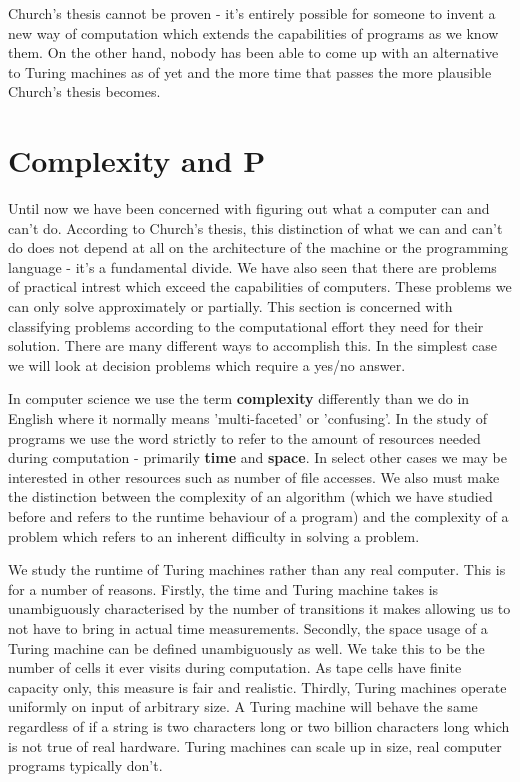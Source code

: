\documentclass[11pt]{article}
\begin{document}
	\par Church's thesis cannot be proven - it's entirely possible for someone to invent a new way of computation which extends the capabilities of programs as we know them. On the other hand, nobody has been able to come up with an alternative to Turing machines as of yet and the more time that passes the more plausible Church's thesis becomes.
	
	\section{Complexity and P}
	Until now we have been concerned with figuring out what a computer can and can't do. According to Church's thesis, this distinction of what we can and can't do does not depend at all on the architecture of the machine or the programming language - it's a fundamental divide. We have also seen that there are problems of practical intrest which exceed the capabilities of computers. These problems we can only solve approximately or partially. This section is concerned with classifying problems according to the computational effort they need for their solution. There are many different ways to accomplish this. In the simplest case we will look at decision problems which require a yes/no answer.
	
	\par 
	In computer science we use the term \textbf{complexity} differently than we do in English where it normally means 'multi-faceted' or 'confusing'. In the study of programs we use the word strictly to refer to the amount of resources needed during computation - primarily \textbf{time} and \textbf{space}. In select other cases we may be interested in other resources such as number of file accesses. We also must make the distinction between the complexity of an algorithm (which we have studied before and refers to the runtime behaviour of a program) and the complexity of a problem which refers to an inherent difficulty in solving a problem. 
	
	\par 
	We study the runtime of Turing machines rather than any real computer. This is for a number of reasons. Firstly, the time and Turing machine takes is unambiguously characterised by the number of transitions it makes allowing us to not have to bring in actual time measurements. Secondly, the space usage of a Turing machine can be defined unambiguously as well. We take this to be the number of cells it ever visits during computation. As tape cells have finite capacity only, this measure is fair and realistic. Thirdly, Turing machines operate uniformly on input of arbitrary size. A Turing machine will behave the same regardless of if a string is two characters long or two billion characters long which is not true of real hardware. Turing machines can scale up in size, real computer programs typically don't.
	
\end{document}
